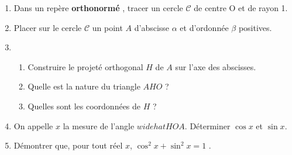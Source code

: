 
\begin{enumerate}
\item Dans un repère \textbf{orthonormé} \Oij, tracer un cercle $\mathscr{C}$ de centre O et de rayon 1.
\item  Placer sur le cercle $\mathscr{C}$ un point $A$ d'abscisse $\alpha$ et d'ordonnée $\beta$  positives.
\item \begin{enumerate}
\item Construire le projeté orthogonal $H$ de $A$ sur l'axe des abscisses. 
\item  Quelle est la nature du triangle $AHO$ ?
\item Quelles sont les coordonnées de $H$ ?
\end{enumerate}
\item  On appelle $x$ la mesure de l'angle $widehat{HOA}$. Déterminer $\cos x$ et $\sin x$.
\item  Démontrer que, pour tout réel $x$, $\cos^2 x + \sin^2 x = 1$ .
\end{enumerate}
